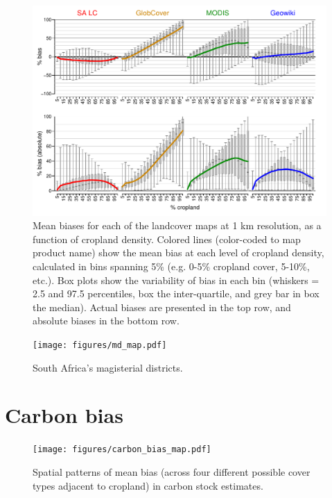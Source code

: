 \documentclass[12pt]{iopart}
\begin{document}

\begin{figure}[ht]
  \centering
     \includegraphics[width = 12cm]{figures/biases_1km.pdf} 
      \caption{Mean biases for each of the landcover maps at 1 km resolution, as a function of cropland density. Colored lines (color-coded to map product name) show the mean bias at each level of cropland density, calculated in bins spanning 5\% (e.g. 0-5\% cropland cover, 5-10\%, etc.). Box plots show the variability of bias in each bin (whiskers = 2.5 and 97.5 percentiles, box the inter-quartile, and grey bar in box the median). Actual biases are presented in the top row, and absolute biases in the bottom row.}
      \label{fig:default}
\end{figure}

\begin{figure}[ht]
  \centering
     \texttt{[image: figures/md\_map.pdf]} 
      \caption{South Africa's magisterial districts.}
      \label{fig:default}
\end{figure}

\section*{Carbon bias}
\begin{figure}[ht]
  \centering
     \texttt{[image: figures/carbon\_bias\_map.pdf]} 
      \caption{Spatial patterns of mean bias (across four different possible cover types adjacent to cropland) in carbon stock estimates. }
      \label{fig:default}
\end{figure}
\end{document}
